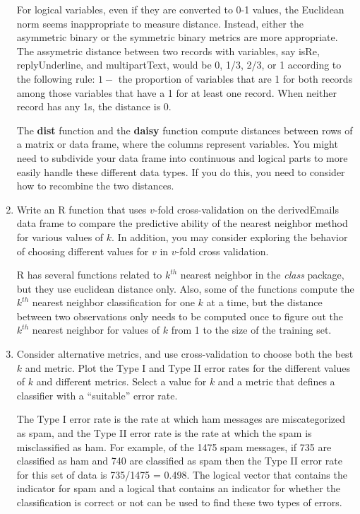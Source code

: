 \documentclass{article}
\def\SFunctionRef#1{\textbf{#1}}
\def\Rpackage#1{\textit{#1}}
\begin{document}
\begin{enumerate}
For logical variables, even if they are converted to 0-1 values, the
Euclidean norm seems inappropriate to measure distance.  Instead,
either the asymmetric binary or the symmetric binary metrics are more
appropriate.  The assymetric distance between two records with
variables, say isRe, replyUnderline, and multipartText, would be 0,
1/3, 2/3, or 1 according to the following rule: $1 -$ the proportion
of variables that are 1 for both records among those variables that
have a 1 for at least one record.  When neither record has any 1s, the
distance is 0.

The \SFunctionRef{dist} function and the
\SFunctionRef{daisy} function compute distances
between rows of a matrix or data frame,
where the columns represent variables.
You might need to subdivide your data frame into continuous
and logical parts to more easily handle these different data
types.
If you do this, you need to consider how to recombine
the two distances.

\item Write an R function that uses $v$-fold cross-validation on 
the derivedEmails data frame to compare the predictive ability of the
nearest neighbor method for various values of $k$. 
In addition, you may consider exploring the behavior of choosing 
different values for $v$ in $v$-fold cross validation.

R has several functions related to $k^{th}$ nearest 
neighbor in the \Rpackage{class} package, but they
use euclidean distance only.
Also, some of the functions compute the $k^{th}$
nearest neighbor classification for one $k$ at a time,
but the distance between two observations only
needs to be computed once to figure out the $k^{th}$
nearest neighbor for values of $k$ from 1 to
the size of the training set.



\item Consider alternative metrics, and use cross-validation
to choose both the best $k$ and metric.
Plot the Type I and Type II error rates for the different
values of $k$ and different metrics. Select a value for $k$ and a 
metric that defines a classifier with a ``suitable'' error rate. 

The Type I error rate is the rate at which ham messages are 
miscategorized as spam, and the Type II error rate is the rate
at which the spam is misclassified as ham.
For example, of the 1475 spam messages, if 735 are classified as
ham and 740 are classified as spam then the Type II error rate
for this set of data is 735/1475 = 0.498.
The logical vector that contains the indicator for spam
and a logical that contains an indicator for whether the
classification is correct or not can be used to find these
two types of errors.


\end{enumerate}
\end{document}
